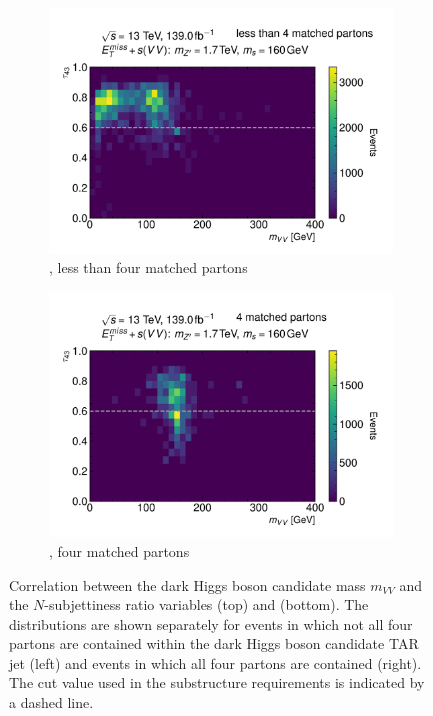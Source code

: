\begin{figure}[hbtp]
\begin{subfigure}{.49\textwidth}
    \centering
    \includegraphics[width=1.\textwidth]{figures/monoS/truthMerged/mzp1700ms160/sVVmerged_truth_lt4matchedquarks_mVStau43.pdf}
    \caption{\taufourthree, less than four matched partons}
  \end{subfigure}
  \begin{subfigure}{.49\textwidth}
    \centering
  \includegraphics[width=1.\textwidth]{figures/monoS/truthMerged/mzp1700ms160/sVVmerged_truth_4matchedquarks_mVStau43.pdf}
    \caption{\taufourthree, four matched partons}
  \end{subfigure}
  \caption{Correlation between the dark Higgs boson candidate mass \(m_{VV}\) and the \(N\)-subjettiness ratio variables \taufourtwo (top) and \taufourthree (bottom). The distributions are shown separately for events in which not all four partons are contained within the dark Higgs boson candidate TAR jet (left) and events in which all four partons are contained (right). The cut value used in the substructure requirements is indicated by a dashed line.}
  \label{fig:monoSVV:selection:sr:substructure-2d}
\end{figure}

